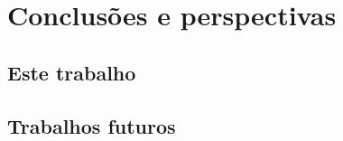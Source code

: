 


\chapter{Conclusões e perspectivas}
\label{sec:conclusao}


\section{Este trabalho}
\label{sec:conclusao:this}



\section{Trabalhos futuros}
\label{sec:conclusao:future}


